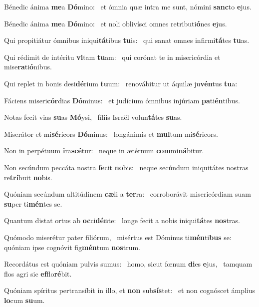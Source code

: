 \item Bénedic ánima \textbf{me}a \textbf{Dó}mino:~\psstar{} et ómnia quæ intra me sunt, nómini \textbf{sanc}to \textbf{e}jus.
\item Bénedic ánima \textbf{me}a \textbf{Dó}mino:~\psstar{} et noli oblivísci omnes retributi\textbf{ó}nes \textbf{e}jus.
\item Qui propitiátur ómnibus iniqui\textbf{tá}tibus \textbf{tu}is:~\psstar{} qui sanat omnes infirmi\textbf{tá}tes \textbf{tu}as.
\item Qui rédimit de intéritu \textbf{vi}tam \textbf{tu}am:~\psstar{} qui corónat te in misericórdia et mise\textbf{ra}ti\textbf{ó}nibus.
\item Qui replet in bonis desi\textbf{dé}rium \textbf{tu}um:~\psstar{} renovábitur ut áquilæ ju\textbf{vén}tus \textbf{tu}a:
\item Fáciens miseri\textbf{cór}dias \textbf{Dó}mi\-nus:~\psstar{} et judícium ómnibus injúriam \textbf{pa}ti\textbf{én}tibus.
\item Notas fecit vias \textbf{su}as \textbf{Mó}ysi,~\psstar{} fíliis Israël volun\textbf{tá}tes \textbf{su}as.
\item Miserátor et mi\textbf{sé}ricors \textbf{Dó}minus:~\psstar{} longánimis et \textbf{mul}tum mi\textbf{sé}ricors.
\item Non in perpétuum \textbf{i}ra\textbf{scé}tur:~\psstar{} neque in ætérnum \textbf{com}mi\textbf{ná}bi\-tur.
\item Non secúndum peccáta nostra \textbf{fe}cit \textbf{no}bis:~\psstar{} neque secúndum iniquitátes nostras re\textbf{trí}buit \textbf{no}bis.
\item Quóniam secúndum altitúdinem \textbf{cæ}li a \textbf{ter}ra:~\psstar{} corroborávit misericórdiam suam \textbf{su}per ti\textbf{mén}tes se.
\item Quantum distat ortus ab \textbf{oc}ci\textbf{dén}te:~\psstar{} longe fecit a nobis iniqui\textbf{tá}tes \textbf{nos}tras.
\item Quómodo miserétur pater filiórum,~\pscross{} misértus est Dóminus ti\textbf{mén}ti\textbf{bus} se:~\psstar{} quóniam ipse cognóvit fig\textbf{mén}tum \textbf{nos}trum.
\item Recordátus est quóniam pulvis sumus:~\pscross{} homo, sicut fœnum \textbf{di}es \textbf{e}jus,~\psstar{} tamquam flos agri sic \textbf{ef}flo\textbf{ré}bit.
\item Quóniam spíritus pertransíbit in illo, et \textbf{non} sub\textbf{sís}tet:~\psstar{} et non cognóscet ámplius \textbf{lo}cum \textbf{su}um.
